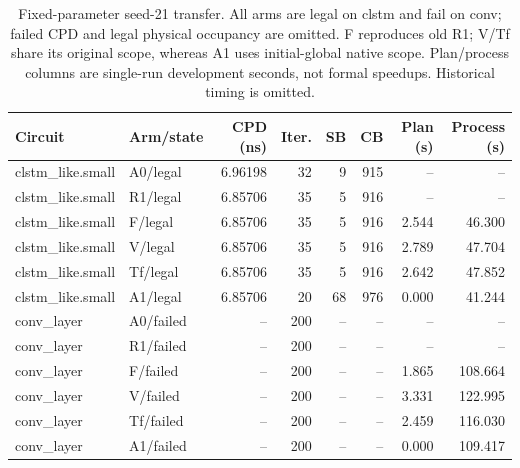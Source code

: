 \begin{table}[t]
\centering\scriptsize
\caption{Fixed-parameter seed-21 transfer. All arms are legal on clstm and fail on conv; failed CPD and legal physical occupancy are omitted. F reproduces old R1; V/Tf share its original scope, whereas A1 uses initial-global native scope. Plan/process columns are single-run development seconds, not formal speedups. Historical timing is omitted.}
\label{tab:target-transfer}
\begin{tabular}{llrrrrrr}
\hline
Circuit & Arm/state & CPD (ns) & Iter. & SB & CB & Plan (s) & Process (s) \\
\hline
clstm\_like.small & A0/legal & 6.96198 & 32 & 9 & 915 & -- & -- \\
clstm\_like.small & R1/legal & 6.85706 & 35 & 5 & 916 & -- & -- \\
clstm\_like.small & F/legal & 6.85706 & 35 & 5 & 916 & 2.544 & 46.300 \\
clstm\_like.small & V/legal & 6.85706 & 35 & 5 & 916 & 2.789 & 47.704 \\
clstm\_like.small & Tf/legal & 6.85706 & 35 & 5 & 916 & 2.642 & 47.852 \\
clstm\_like.small & A1/legal & 6.85706 & 20 & 68 & 976 & 0.000 & 41.244 \\
conv\_layer & A0/failed & -- & 200 & -- & -- & -- & -- \\
conv\_layer & R1/failed & -- & 200 & -- & -- & -- & -- \\
conv\_layer & F/failed & -- & 200 & -- & -- & 1.865 & 108.664 \\
conv\_layer & V/failed & -- & 200 & -- & -- & 3.331 & 122.995 \\
conv\_layer & Tf/failed & -- & 200 & -- & -- & 2.459 & 116.030 \\
conv\_layer & A1/failed & -- & 200 & -- & -- & 0.000 & 109.417 \\
\hline
\end{tabular}
\end{table}
